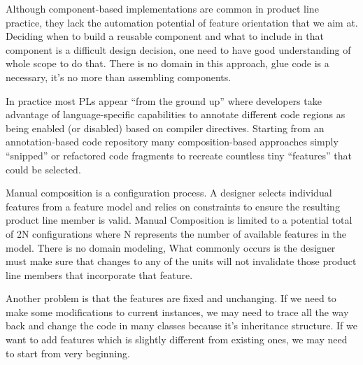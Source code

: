 Although component-based implementations are common in product line practice, they lack the automation potential
of feature orientation that we aim at. Deciding when to build a reusable component and what to include in
that component is a difficult design decision, one need to have good understanding of whole scope to do that.
There is no domain in this approach, glue code is a necessary, it's no more than assembling components.
~\cite{Apel:2013:FSP:2541773}

In practice most PLs appear “from the ground up” where developers take advantage of language-specific capabilities
 to annotate different code regions as being enabled (or disabled) based on compiler directives. Starting from an
 annotation-based code repository many composition-based approaches simply “snipped” or refactored code fragments
 to recreate countless tiny “features” that could be selected.

Manual composition is a configuration process. A designer selects individual features from a feature model and
relies on constraints to ensure the resulting product line member is valid. Manual Composition is limited to a
potential total of 2N configurations where N represents the number of available features in the model. There is no
 domain modeling, What commonly occurs is the designer must make sure that changes to any of the units will not invalidate those product
 line members that incorporate that feature.

 Another problem is that the features are fixed and unchanging. If we need to make some modifications to current
 instances, we may need to trace all the way back and change the code in many classes because it’s inheritance
 structure. If we want to add features which is slightly different from existing ones, we may need to start from
 very beginning.
